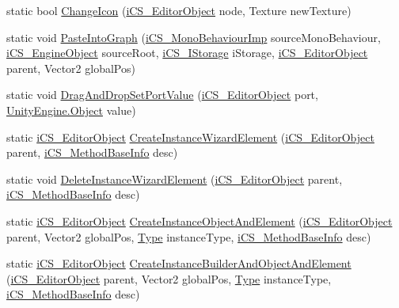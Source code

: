 \begin{DoxyCompactItemize}
\item 
static bool \hyperlink{classi_c_s___user_commands_af4f606eca295ec29af1d9d9ff4090d8c}{Change\+Icon} (\hyperlink{classi_c_s___editor_object}{i\+C\+S\+\_\+\+Editor\+Object} node, Texture new\+Texture)
\item 
static void \hyperlink{classi_c_s___user_commands_acd2fadde58a6cbc56b6f0c6415a0b954}{Paste\+Into\+Graph} (\hyperlink{classi_c_s___mono_behaviour_imp}{i\+C\+S\+\_\+\+Mono\+Behaviour\+Imp} source\+Mono\+Behaviour, \hyperlink{classi_c_s___engine_object}{i\+C\+S\+\_\+\+Engine\+Object} source\+Root, \hyperlink{classi_c_s___i_storage}{i\+C\+S\+\_\+\+I\+Storage} i\+Storage, \hyperlink{classi_c_s___editor_object}{i\+C\+S\+\_\+\+Editor\+Object} parent, Vector2 global\+Pos)
\item 
static void \hyperlink{classi_c_s___user_commands_a5121c22ea2936d882097beeaa0cd0bd3}{Drag\+And\+Drop\+Set\+Port\+Value} (\hyperlink{classi_c_s___editor_object}{i\+C\+S\+\_\+\+Editor\+Object} port, \hyperlink{i_c_s___logic_8cs_a5b2c8b05b9a357906d7f9e5b2c1e154d}{Unity\+Engine.\+Object} value)
\item 
static \hyperlink{classi_c_s___editor_object}{i\+C\+S\+\_\+\+Editor\+Object} \hyperlink{classi_c_s___user_commands_a5534a93887a8f0695b39178d60598471}{Create\+Instance\+Wizard\+Element} (\hyperlink{classi_c_s___editor_object}{i\+C\+S\+\_\+\+Editor\+Object} parent, \hyperlink{classi_c_s___method_base_info}{i\+C\+S\+\_\+\+Method\+Base\+Info} desc)
\item 
static void \hyperlink{classi_c_s___user_commands_a13fb15c0fc07f4b506646e76f7bc2282}{Delete\+Instance\+Wizard\+Element} (\hyperlink{classi_c_s___editor_object}{i\+C\+S\+\_\+\+Editor\+Object} parent, \hyperlink{classi_c_s___method_base_info}{i\+C\+S\+\_\+\+Method\+Base\+Info} desc)
\item 
static \hyperlink{classi_c_s___editor_object}{i\+C\+S\+\_\+\+Editor\+Object} \hyperlink{classi_c_s___user_commands_a9a58c3b564028ce32e3f09326628108b}{Create\+Instance\+Object\+And\+Element} (\hyperlink{classi_c_s___editor_object}{i\+C\+S\+\_\+\+Editor\+Object} parent, Vector2 global\+Pos, \hyperlink{i_c_s___object_type_enum_8cs_ae6c3dd6d8597380b56d94908eb431547aa1fa27779242b4902f7ae3bdd5c6d508}{Type} instance\+Type, \hyperlink{classi_c_s___method_base_info}{i\+C\+S\+\_\+\+Method\+Base\+Info} desc)
\item 
static \hyperlink{classi_c_s___editor_object}{i\+C\+S\+\_\+\+Editor\+Object} \hyperlink{classi_c_s___user_commands_a16aae13d902ba3512181afea98d61440}{Create\+Instance\+Builder\+And\+Object\+And\+Element} (\hyperlink{classi_c_s___editor_object}{i\+C\+S\+\_\+\+Editor\+Object} parent, Vector2 global\+Pos, \hyperlink{i_c_s___object_type_enum_8cs_ae6c3dd6d8597380b56d94908eb431547aa1fa27779242b4902f7ae3bdd5c6d508}{Type} instance\+Type, \hyperlink{classi_c_s___method_base_info}{i\+C\+S\+\_\+\+Method\+Base\+Info} desc)

\end{DoxyCompactItemize}
